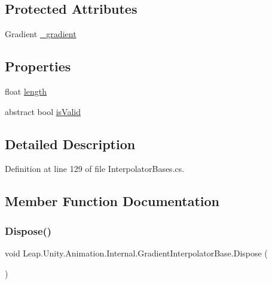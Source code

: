 \subsection*{Protected Attributes}
\begin{DoxyCompactItemize}
\item 
Gradient \mbox{\hyperlink{class_leap_1_1_unity_1_1_animation_1_1_internal_1_1_gradient_interpolator_base_a2f833d0dac055f27997e0b67f850d549}{\+\_\+gradient}}
\end{DoxyCompactItemize}
\subsection*{Properties}
\begin{DoxyCompactItemize}
\item 
float \mbox{\hyperlink{class_leap_1_1_unity_1_1_animation_1_1_internal_1_1_gradient_interpolator_base_ae1a4415a87d2d844ab44600443cd8aca}{length}}
\item 
abstract bool \mbox{\hyperlink{class_leap_1_1_unity_1_1_animation_1_1_internal_1_1_gradient_interpolator_base_a06c759662ea38766b1fd32ba57ccc47e}{is\+Valid}}
\end{DoxyCompactItemize}


\subsection{Detailed Description}


Definition at line 129 of file Interpolator\+Bases.\+cs.



\subsection{Member Function Documentation}
\mbox{\label{class_leap_1_1_unity_1_1_animation_1_1_internal_1_1_gradient_interpolator_base_ac4a403d938f0487355ed7f25b9fbea43}} 
\subsubsection{\texorpdfstring{Dispose()}{Dispose()}}
{\footnotesize\ttfamily void Leap.\+Unity.\+Animation.\+Internal.\+Gradient\+Interpolator\+Base.\+Dispose (\begin{DoxyParamCaption}{ }\end{DoxyParamCaption})}



